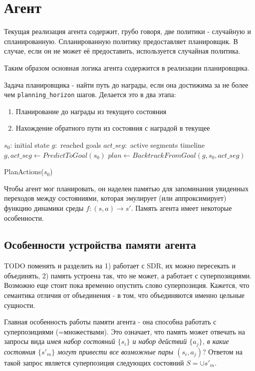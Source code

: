 \documentclass[a4paper]{article}
\begin{document}
\section{Агент}

Текущая реализация агента содержит, грубо говоря, две политики - случайную и спланированную. Спланированную политику предоставляет планировщик. В случае, если он не может её предоставить, используется случайная политика.

Таким образом основная логика агента содержится в реализации планировщика.

Задача планировщика - найти путь до награды, если она достижима за не более чем \verb|planning_horizon| шагов. Делается это в два этапа:

\begin{enumerate}
    \item Планирование до награды из текущего состояния
    \item Нахождение обратного пути из состояния с наградой в текущее
\end{enumerate}

\begin{function}
  \SetAlgoNoLine
  $s_0$: initial state \;
  $g: $ reached goals \;
  $act\_seg: $ active segments timeline \;
  \quad \\

  $g, act\_seg \leftarrow PredictToGoal(s_0)$ \;
  $plan \leftarrow BacktrackFromGoal(g, s_0, act\_seg)$ \;

  \caption{PlanActions($s_0$)}
\end{function}

Чтобы агент мог планировать, он наделен памятью для запоминания увиденных переходов между состояниями, которая эмулирует (или аппроксимирует) функцию динамики среды $f: (s, a) \rightarrow s'$. Память агента имеет некоторые особенности.

\subsection{Особенности устройства памяти агента}

TODO поменять и разделить на 1) работает с SDR, их можно пересекать и объединять, 2) память устроена так, что не может, а работает с суперпозициями. Возможно еще стоит пока временно опустить слово суперпозиция. Кажется, что семантика отличия от объединения - в том, что объединяются именно цельные сущности.

Главная особенность работы памяти агента - она способна работать с суперпозициями (=множествами). Это означает, что память может отвечать на запросы вида \textit{имея набор состояний $\{s_i\}$ и набор действий $\{a_j\}$, в какие состояния $\{s'_m\}$ могут привести все возможные пары $(s_i, a_j)$}? Ответом на такой запрос является суперпозиция следующих состояний $S = \cup s'_m$.
\end{document}
